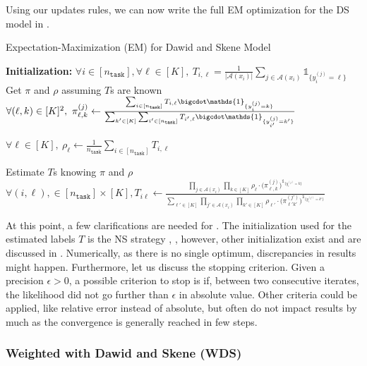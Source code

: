 Using our updates rules, we can now write the full EM optimization for the DS model in .

\begin{algorithm}
\caption{Expectation-Maximization (EM) for Dawid and Skene Model}
\label{alg:ds}
\begin{algorithmic}[1]
    \STATE \textbf{Initialization:} $\forall i\in[n_\texttt{task}], \forall \ell\in[K],\ {T}_{i,\ell} = \frac{1}{|\mathcal{A}(x_i)|} {\sum_{j \in \mathcal{A}(x_i)} \mathds{1}_{\{y_i^{(j)}=\ell\}} }$
        \STATE Get ${\pi}$ and $\rho$ assuming ${T}$s are known%
        \STATE$ \forall (\ell, k)\in [K]^2,\ {\pi}^{(j)}_{\ell, k} \gets
            \frac{\sum_{i\in[n_\texttt{task}]}{T}_{i,\ell} \bigcdot \mathds{1}_{\{y_i^{(j)}=k\}}}{\sum_{k'\in[K]}\sum_{i'\in[n_\texttt{task}]}{T}_{i',\ell} \bigcdot \mathds{1}_{\{y_{i'}^{(j)}= k'\}}}$

        \STATE $\forall \ell \in [K],\ \rho_\ell\gets \frac{1}{n_\texttt{task}} {\sum_{i \in [n_\texttt{task}]} {T}_{i,\ell}}$

        \STATE Estimate $ T$s knowing $\pi$ and $\rho$
        \STATE $\forall (i,\ell),
            \in[n_{\texttt{task}}] \times [K],
             T_{i \ell}
            \gets
            \frac{\prod_{j\in \mathcal{A}(x_i)}\prod_{k\in[K]} \rho_\ell \cdot \big(\pi^{(j)}_{\ell, k}\big)^{\mathds{1}_{\{y_i^{(j)}=k\}}}}
            {\sum_{\ell' \in [K]}\prod_{j'\in \mathcal{A}(x_i)}\prod_{k' \in [K]} \rho_{\ell'}\cdot \big(\pi^{(j')}_{\ell' k'}\big)^{\mathds{1}_{\{y_i^{(j')}=k'\}}}}$
    \ENDWHILE
\end{algorithmic}
\end{algorithm}

At this point, a few clarifications are needed for .
The initialization used for the estimated labels $T$ is the NS strategy , , however, other initialization exist and are discussed in \citet{dawid_maximum_1979}.
Numerically, as there is no single optimum, discrepancies in results might happen.
Furthermore, let us discuss the stopping criterion.
Given a precision $\epsilon>0$, a possible criterion to stop is if, between two consecutive iterates, the likelihood did not go further than $\epsilon$ in absolute value.
Other criteria could be applied, like relative error instead of absolute, but often do not impact results by much as the convergence is generally reached in few steps.

\subsubsection{Weighted with Dawid and Skene (WDS)}
\label{subsub:wds}


